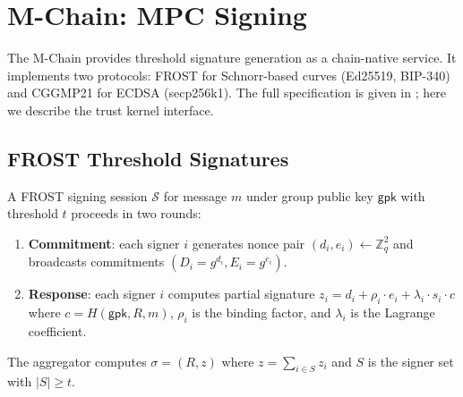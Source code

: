 

\section{M-Chain: MPC Signing}
\label{sec:mchain}

The M-Chain provides threshold signature generation as a chain-native service. It
implements two protocols: FROST for Schnorr-based curves (Ed25519, BIP-340) and
CGGMP21 for ECDSA (secp256k1). The full specification is given in
\cite{lux-mchain-mpc}; here we describe the trust kernel interface.

\subsection{FROST Threshold Signatures}

\begin{definition}\label{def:frost}
A FROST signing session $\mathcal{S}$ for message $m$ under group public key
$\mathsf{gpk}$ with threshold $t$ proceeds in two rounds:
\begin{enumerate}
    \item \textbf{Commitment}: each signer $i$ generates nonce pair
          $(d_i, e_i) \gets \mathbb{Z}_q^2$ and broadcasts commitments
          $(D_i = g^{d_i}, E_i = g^{e_i})$.
    \item \textbf{Response}: each signer $i$ computes partial signature
          $z_i = d_i + \rho_i \cdot e_i + \lambda_i \cdot s_i \cdot c$
          where $c = H(\mathsf{gpk}, R, m)$, $\rho_i$ is the binding factor,
          and $\lambda_i$ is the Lagrange coefficient.
\end{enumerate}
The aggregator computes $\sigma = (R, z)$ where $z = \sum_{i \in S} z_i$ and $S$
is the signer set with $|S| \geq t$.
\end{definition}

